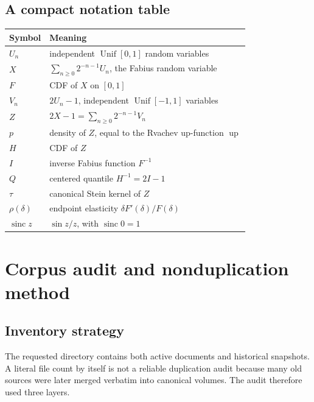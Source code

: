 \documentclass[11pt,oneside]{article}
\theoremstyle{definition}
\theoremstyle{remark}
\newcommand{\Up}{\operatorname{up}}
\newcommand{\sinc}{\operatorname{sinc}}
\begin{document}
\subsection{A compact notation table}
\begin{center}
\begin{tabularx}{0.94\textwidth}{l X}
\toprule
Symbol & Meaning\\
\midrule
$U_n$ & independent $\operatorname{Unif}[0,1]$ random variables\\
$X$ & $\sum_{n\ge0}2^{-n-1}U_n$, the Fabius random variable\\
$F$ & CDF of $X$ on $[0,1]$\\
$V_n$ & $2U_n-1$, independent $\operatorname{Unif}[-1,1]$ variables\\
$Z$ & $2X-1=\sum_{n\ge0}2^{-n-1}V_n$\\
$p$ & density of $Z$, equal to the Rvachev up-function $\Up$\\
$H$ & CDF of $Z$\\
$I$ & inverse Fabius function $F^{-1}$\\
$Q$ & centered quantile $H^{-1}=2I-1$\\
$\tau$ & canonical Stein kernel of $Z$\\
$\rho(\delta)$ & endpoint elasticity $\delta F'(\delta)/F(\delta)$\\
$\sinc z$ & $\sin z/z$, with $\sinc 0=1$\\
\bottomrule
\end{tabularx}
\end{center}

\section{Corpus audit and nonduplication method}

\subsection{Inventory strategy}
The requested directory contains both active documents and historical snapshots.
A literal file count by itself is not a reliable duplication audit because many
old sources were later merged verbatim into canonical volumes.  The audit therefore
used three layers.
\end{document}
